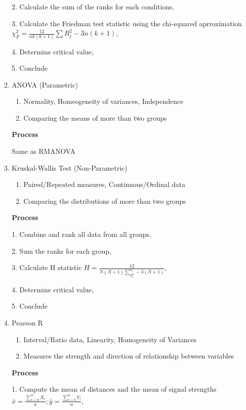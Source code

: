 \documentclass[6pt]{article}
\begin{document}
\begin{multicols*}{2}
\begin{enumerate}
        2. Calculate the sum of the ranks for each conditions,

        3. Calculate the Friedman test statistic using the chi-squared aprroximation $\displaystyle \chi_F^2 = \frac{12}{nk(k+1)}\sum{R_j^2-3n(k+1)}$,
    
        4. Determine critical value,

        5. Conclude

        \item ANOVA (Parametric)
        \begin{enumerate}
            \item Normality, Homeogeneity of variances, Independence
            \item Comparing the means of more than two groups
        \end{enumerate}
        \textbf{Process}

        Same as RMANOVA

        \item Kruskal-Wallis Test (Non-Parametric)
        \begin{enumerate}
            \item Paired/Repeated measures, Continuous/Ordinal data
            \item Comparing the distributions of more than two groups
        \end{enumerate}
        \textbf{Process}
            
        1. Combine and rank all data from all groups, 
    
        2. Sum the ranks for each group,

        3. Calculate H statistic $\displaystyle H = \frac{12}{N(N+1)\sum_{R_i^2}^{n_i}-3(N+1)}$,
    
        4. Determine critical value,

        5. Conclude
        \item Pearson R
        \begin{enumerate}
            \item Interval/Ratio data, Linearity, Homogeneity of Variances
            \item Measures the strength and direction of relationship between variables
        \end{enumerate}
        \textbf{Process}
            
        1. Compute the mean of distances and the mean of signal strengths $\displaystyle \bar{x} = \frac{\sum_{i=0}^n{X_i}}{n}; \bar{y} = \frac{\sum_{i=0}^n{Y_i}}{n}$, 
    

\end{enumerate}
\end{multicols*}
\end{document}

